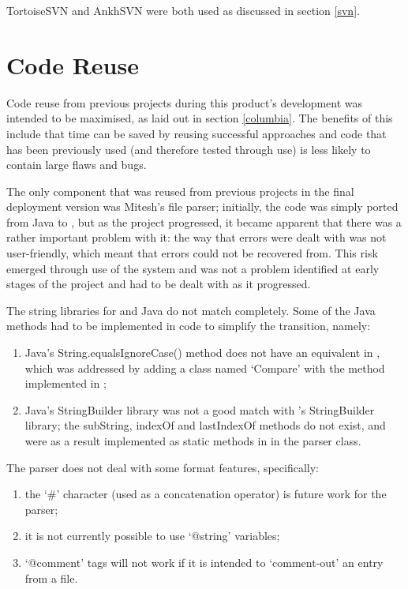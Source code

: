 TortoiseSVN and AnkhSVN were both used as discussed in section \ref{svn}.

\section{Code Reuse}
\label{codeReuse}
Code reuse from previous projects during this product's development was intended to be maximised, as laid out in section \ref{columbia}.  The benefits of this include that time can be saved by reusing successful approaches and code that has been previously used (and therefore tested through use) is less likely to contain large flaws and bugs.

The only component that was reused from previous projects in the final deployment version was Mitesh's \bibtex{} file parser;  initially, the code was simply ported from Java to \cs, but as the project progressed, it became apparent that there was a rather important problem with it: the way that errors were dealt with was not user-friendly, which meant that errors could not be recovered from.  This risk emerged through use of the system and was not a problem identified at early stages of the project and had to be dealt with as it progressed.

The string libraries for \cs{} and Java do not match completely.  Some of the Java methods had to be implemented in \cs{} code to simplify the transition, namely:
\begin{enumerate}
	\item Java's String.equalsIgnoreCase() method does not have an equivalent in \cs, which was addressed by adding a class named `Compare' with the method implemented in \cs;
	\item Java's StringBuilder library was not a good match with \cs's StringBuilder library; the subString, indexOf and lastIndexOf methods do not exist, and were as a result implemented as static methods in \cs{} in the parser class.
\end{enumerate}

The parser does not deal with some \bibtex{} format features, specifically:
\begin{enumerate}
	\item the `\#' character (used as a concatenation operator) is future work for the parser;
	\item it is not currently possible to use `@string' variables;
	\item `@comment' tags will not work if it is intended to `comment-out' an entry from a file.
\end{enumerate}
	


